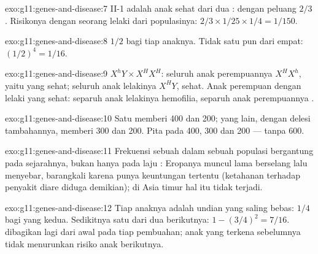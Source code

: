 \begin{solution}{exo:g11:genes-and-disease:7}
II-1 adalah anak sehat dari dua :  dengan peluang $2/3$.
Risikonya dengan seorang lelaki dari populasinya: $2/3 \times 1/25 \times 1/4
= 1/150$.
\end{solution}

\begin{solution}{exo:g11:genes-and-disease:8}
$1/2$ bagi tiap anaknya. Tidak satu pun dari empat: $(1/2)^4 = 1/16$.
\end{solution}

\begin{solution}{exo:g11:genes-and-disease:9}
$X^hY \times X^HX^H$: seluruh anak perempuannya $X^HX^h$, yaitu 
yang sehat; seluruh anak lelakinya $X^HY$, sehat. Anak perempuan
 dengan lelaki yang sehat: separuh anak lelakinya hemofilia,
separuh anak perempuannya .
\end{solution}

\begin{solution}{exo:g11:genes-and-disease:10}
Satu  memberi 400 dan 200;  yang lain, dengan delesi
tambahannya, memberi 300 dan 200. Pita pada 400, 300 dan 200 ---
tanpa 600.
\end{solution}

\begin{solution}{exo:g11:genes-and-disease:11}
Frekuensi sebuah  dalam sebuah populasi bergantung pada sejarahnya,
bukan hanya pada laju :  Eropanya muncul lama berselang
lalu menyebar, barangkali karena  punya keuntungan tertentu
(ketahanan terhadap penyakit diare diduga demikian); di Asia timur hal
itu tidak terjadi.
\end{solution}

\begin{solution}{exo:g11:genes-and-disease:12}
Tiap anaknya adalah undian yang saling bebas: $1/4$ bagi yang kedua.
Sedikitnya satu dari dua berikutnya: $1 - (3/4)^2 = 7/16$. 
dibagikan lagi dari awal pada tiap pembuahan; anak yang terkena
sebelumnya tidak menurunkan risiko anak berikutnya.
\end{solution}


